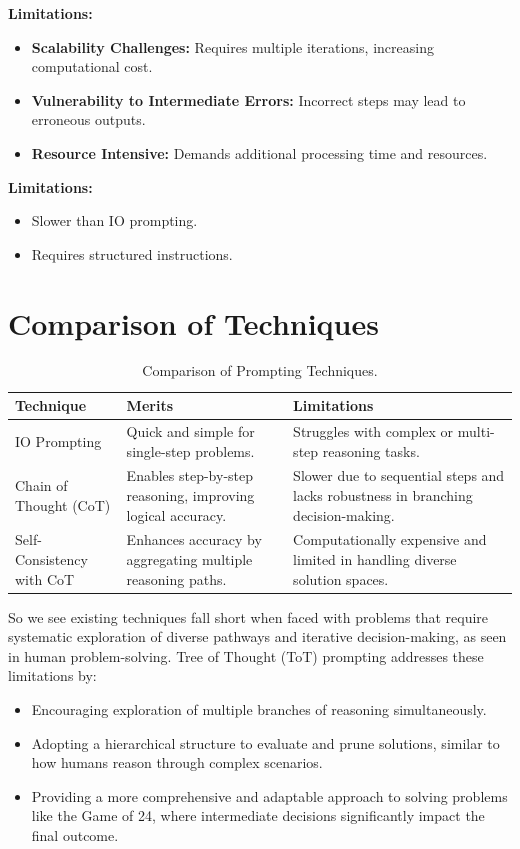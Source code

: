 \documentclass[12pt, a4paper]{article}
\begin{document}
\textbf{Limitations:}  
\begin{itemize}
    \item \textbf{Scalability Challenges:} Requires multiple iterations, increasing computational cost.  
    \item \textbf{Vulnerability to Intermediate Errors:} Incorrect steps may lead to erroneous outputs.  
    \item \textbf{Resource Intensive:} Demands additional processing time and resources.  
\end{itemize}


\textbf{Limitations:}
\begin{itemize}
    \item Slower than IO prompting.
    \item Requires structured instructions.
\end{itemize}


\section{Comparison of Techniques}

\begin{table}[H]
    \centering
    \begin{tabular}{@{}p{3.5cm}p{6.5cm}p{6.5cm}@{}}
    \toprule
    \textbf{Technique}       & \textbf{Merits}                                & \textbf{Limitations}                         \\
    \midrule
    IO Prompting             & Quick and simple for single-step problems.     & Struggles with complex or multi-step reasoning tasks. \\
    Chain of Thought (CoT)   & Enables step-by-step reasoning, improving logical accuracy. & Slower due to sequential steps and lacks robustness in branching decision-making. \\
    Self-Consistency with CoT & Enhances accuracy by aggregating multiple reasoning paths. & Computationally expensive and limited in handling diverse solution spaces. \\
    \bottomrule
    \end{tabular}
    \caption{Comparison of Prompting Techniques.}
    \label{tab:techniques-comparison}
\end{table}

So we see existing techniques fall short when faced with problems that require systematic exploration of diverse pathways and iterative decision-making, as seen in human problem-solving. Tree of Thought (ToT) prompting addresses these limitations by:
\begin{itemize}
    \item Encouraging exploration of multiple branches of reasoning simultaneously.
    \item Adopting a hierarchical structure to evaluate and prune solutions, similar to how humans reason through complex scenarios.
    \item Providing a more comprehensive and adaptable approach to solving problems like the Game of 24, where intermediate decisions significantly impact the final outcome.
\end{itemize}
\end{document}
